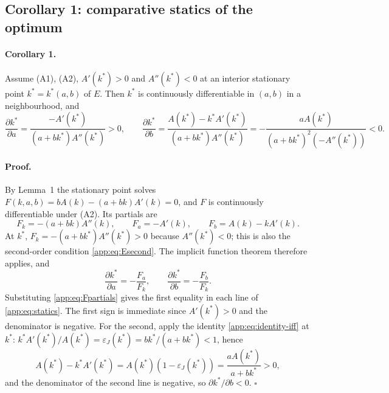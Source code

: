 \subsection{Corollary 1: comparative statics of the optimum}\label{app:cor:statics}

\paragraph{Corollary 1.} Assume (A1), (A2), $A'(k^{*})>0$ and $A''(k^{*})<0$ at an
interior stationary point $k^{*}=k^{*}(a,b)$ of $E$. Then $k^{*}$ is continuously
differentiable in $(a,b)$ in a neighbourhood, and
\begin{equation}\label{app:eq:statics}
  \frac{\partial k^{*}}{\partial a}
  =\frac{-A'(k^{*})}{(a+bk^{*})A''(k^{*})}>0,
  \qquad
  \frac{\partial k^{*}}{\partial b}
  =\frac{A(k^{*})-k^{*}A'(k^{*})}{(a+bk^{*})A''(k^{*})}
  =-\frac{aA(k^{*})}{(a+bk^{*})^{2}\left(-A''(k^{*})\right)}<0 .
\end{equation}

\paragraph{Proof.} By Lemma~1 the stationary point solves
$F(k,a,b)=bA(k)-(a+bk)A'(k)=0$, and $F$ is continuously differentiable under
(A2). Its partials are
\begin{equation}\label{app:eq:Fpartials}
  F_{k}=-(a+bk)A''(k),
  \qquad
  F_{a}=-A'(k),
  \qquad
  F_{b}=A(k)-kA'(k).
\end{equation}
At $k^{*}$, $F_{k}=-(a+bk^{*})A''(k^{*})>0$ because $A''(k^{*})<0$; this is also
the second-order condition \eqref{app:eq:Esecond}. The implicit function theorem
therefore applies, and
\begin{equation}\label{app:eq:IFT}
  \frac{\partial k^{*}}{\partial a}=-\frac{F_{a}}{F_{k}},
  \qquad
  \frac{\partial k^{*}}{\partial b}=-\frac{F_{b}}{F_{k}} .
\end{equation}
Substituting \eqref{app:eq:Fpartials} gives the first equality in each line of
\eqref{app:eq:statics}. The first sign is immediate since $A'(k^{*})>0$ and the
denominator is negative. For the second, apply the identity
\eqref{app:eq:identity-iff} at $k^{*}$:
$k^{*}A'(k^{*})/A(k^{*})=\varepsilon_{J}(k^{*})=bk^{*}/(a+bk^{*})<1$, hence
\begin{equation}\label{app:eq:Fbpositive}
  A(k^{*})-k^{*}A'(k^{*})
  =A(k^{*})\left(1-\varepsilon_{J}(k^{*})\right)
  =\frac{aA(k^{*})}{a+bk^{*}}>0,
\end{equation}
and the denominator of the second line is negative, so
$\partial k^{*}/\partial b<0$. \hfill$\square$

